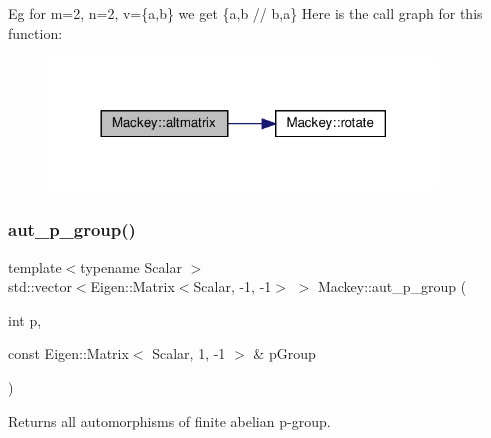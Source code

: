 Eg for m=2, n=2, v=\{a,b\} we get \{a,b // b,a\} Here is the call graph for this function\+:\nopagebreak
\begin{figure}[H]
\begin{center}
\leavevmode
\includegraphics[width=293pt]{namespaceMackey_a26a529f63caac9c5b4dc809e0e5831be_cgraph}
\end{center}
\end{figure}
\mbox{\label{namespaceMackey_ab3832e52497b387d4553af06aa26ec99}} 
\subsubsection{\texorpdfstring{aut\+\_\+p\+\_\+group()}{aut\_p\_group()}}
{\footnotesize\ttfamily template$<$typename Scalar $>$ \\
std\+::vector$<$Eigen\+::\+Matrix$<$Scalar, -\/1, -\/1$>$ $>$ Mackey\+::aut\+\_\+p\+\_\+group (\begin{DoxyParamCaption}\item[{int}]{p,  }\item[{const Eigen\+::\+Matrix$<$ Scalar, 1, -\/1 $>$ \&}]{p\+Group }\end{DoxyParamCaption})}



Returns all automorphisms of finite abelian p-\/group. 

